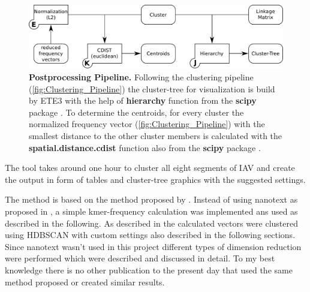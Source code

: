 \begin{figure}[!hbt]
    \centering
    \includegraphics[width=\textwidth]{Graphics/Tree.pdf}
    \caption[Postprocessing Pipeline]{\textbf{Postprocessing Pipeline.} Following the clustering pipeline (\autoref{fig:Clustering_Pipeline}) the cluster-tree for visualization is build by ETE3 with the help of \textbf{hierarchy} function from the \textbf{scipy} package \autocite{huerta-cepas_ete_2016, scipy_10_contributors_scipy_2020}. To determine the centroids, for every cluster the normalized frequency vector (\autoref{fig:Clustering_Pipeline}) with the smallest distance to the other cluster members is calculated with the \textbf{spatial.distance.cdist} function also from the \textbf{scipy} package \autocite{scipy_10_contributors_scipy_2020}.}
    \label{fig:Tree_Pipeline}
\end{figure}

The tool takes around one hour to cluster all eight segments of \gls{IAV} and create the output in form of tables and cluster-tree graphics with the suggested settings. 

The method is based on the method proposed by \autocite{viehweger_addressing_2019}. Instead of using nanotext as proposed in \autocite{viehweger_encoding_2019}, a simple kmer-frequency calculation was implemented ans used as described in the following. As described in \autocite{viehweger_addressing_2019} the calculated vectors were clustered using \gls{HDBSCAN} with custom settings also described in the following sections. Since nanotext wasn't used in this project different types of dimension reduction were performed which were described and discussed in detail. To my best knowledge there is no other publication to the present day that used the same method proposed or created similar results.

\nopagebreak[1]













